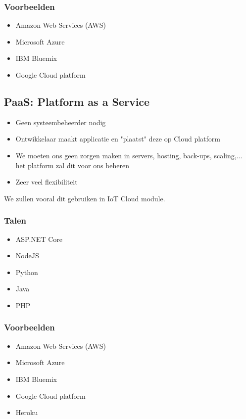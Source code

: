 \documentclass{article}
\begin{document}
\subsubsection{Voorbeelden}
\begin{itemize}
    \item Amazon Web Services (AWS)
    \item Microsoft Azure
    \item IBM Bluemix
    \item Google Cloud platform
\end{itemize}

\subsection{PaaS: Platform as a Service}

\begin{itemize}
    \item Geen systeembeheerder nodig
    \item Ontwikkelaar maakt applicatie en "plaatst" deze op Cloud platform
    \item We moeten ons geen zorgen maken in servers, hosting, back-ups, scaling,... het platform zal dit voor ons beheren
    \item Zeer veel flexibiliteit
\end{itemize}

We zullen vooral dit gebruiken in IoT Cloud module.

\subsubsection{Talen}
\begin{itemize}
    \item ASP.NET Core
    \item NodeJS
    \item Python
    \item Java
    \item PHP
\end{itemize}

\subsubsection{Voorbeelden}
\begin{itemize}
    \item Amazon Web Services (AWS)
    \item Microsoft Azure
    \item IBM Bluemix
    \item Google Cloud platform
    \item Heroku
\end{itemize}
\end{document}

